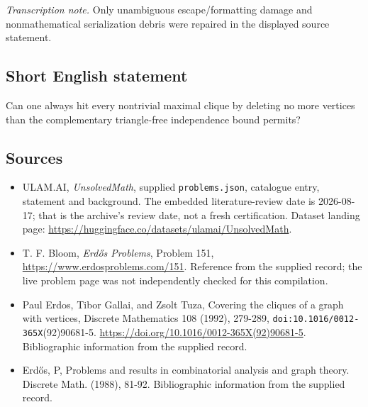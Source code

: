 \documentclass[11pt,a4paper]{article}
\begin{document}
{\small\emph{Transcription note.} Only unambiguous escape/formatting damage and nonmathematical serialization debris were repaired in the displayed source statement.}

\subsection{Short English statement}

Can one always hit every nontrivial maximal clique by deleting no more vertices than the complementary triangle-free independence bound permits?

\subsection{Sources}

{\small

\begin{itemize}

\item[\hypertarget{source:statement:1}{S1}] ULAM.AI, \emph{UnsolvedMath}, supplied \texttt{problems.json}, catalogue entry, statement and background. The embedded literature-review date is 2026-08-17; that is the archive’s review date, not a fresh certification. Dataset landing page: \url{https://huggingface.co/datasets/ulamai/UnsolvedMath}.

\item[\hypertarget{source:statement:2}{S2}] T. F. Bloom, \emph{Erdős Problems}, Problem 151, \url{https://www.erdosproblems.com/151}. Reference from the supplied record; the live problem page was not independently checked for this compilation.

\item[\hypertarget{source:statement:3}{S3}] Paul Erdos, Tibor Gallai, and Zsolt Tuza, Covering the cliques of a graph with vertices, Discrete Mathematics 108 (1992), 279-289, \nolinkurl{doi:10.1016/0012-365X}(92)90681-5. \url{https://doi.org/10.1016/0012-365X(92)90681-5}. Bibliographic information from the supplied record.

\item[\hypertarget{source:statement:4}{S4}] Erd\H{o}s, P, Problems and results in combinatorial analysis and graph theory. Discrete Math. (1988), 81-92. Bibliographic information from the supplied record.

\end{itemize}

}

\label{end:statement}
\end{document}
